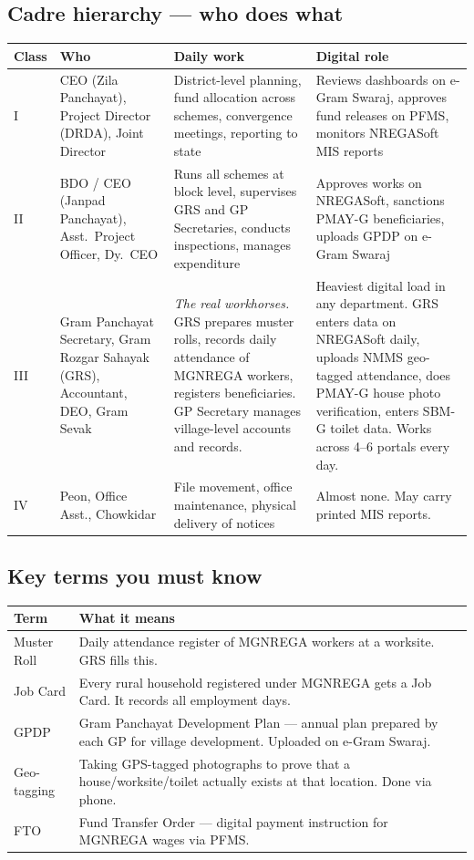 \documentclass[11pt,a4paper]{article}
\begin{document}
\subsection{Cadre hierarchy --- who does what}

\begin{tabularx}{\textwidth}{@{}L{1cm} L{3.5cm} L{4.5cm} X@{}}
\toprule
\textbf{Class} & \textbf{Who} & \textbf{Daily work} & \textbf{Digital role} \\
\midrule
I & CEO (Zila Panchayat), Project Director (DRDA), Joint Director & District-level planning, fund allocation across schemes, convergence meetings, reporting to state & Reviews dashboards on e-Gram Swaraj, approves fund releases on PFMS, monitors NREGASoft MIS reports \\[6pt]
II & BDO / CEO (Janpad Panchayat), Asst.\ Project Officer, Dy.\ CEO & Runs all schemes at block level, supervises GRS and GP Secretaries, conducts inspections, manages expenditure & Approves works on NREGASoft, sanctions PMAY-G beneficiaries, uploads GPDP on e-Gram Swaraj \\[6pt]
III & Gram Panchayat Secretary, Gram Rozgar Sahayak (GRS), Accountant, DEO, Gram Sevak & \textit{The real workhorses.} GRS prepares muster rolls, records daily attendance of MGNREGA workers, registers beneficiaries. GP Secretary manages village-level accounts and records. & Heaviest digital load in any department. GRS enters data on NREGASoft daily, uploads NMMS geo-tagged attendance, does PMAY-G house photo verification, enters SBM-G toilet data. Works across 4--6 portals every day. \\[6pt]
IV & Peon, Office Asst., Chowkidar & File movement, office maintenance, physical delivery of notices & Almost none. May carry printed MIS reports. \\
\bottomrule
\end{tabularx}

\subsection{Key terms you must know}

\begin{tabularx}{\textwidth}{@{}L{3cm} X@{}}
\toprule
\textbf{Term} & \textbf{What it means} \\
\midrule
Muster Roll & Daily attendance register of MGNREGA workers at a worksite. GRS fills this. \\
Job Card & Every rural household registered under MGNREGA gets a Job Card. It records all employment days. \\
GPDP & Gram Panchayat Development Plan --- annual plan prepared by each GP for village development. Uploaded on e-Gram Swaraj. \\
Geo-tagging & Taking GPS-tagged photographs to prove that a house/worksite/toilet actually exists at that location. Done via phone. \\
FTO & Fund Transfer Order --- digital payment instruction for MGNREGA wages via PFMS. \\
\bottomrule
\end{tabularx}
\end{document}
